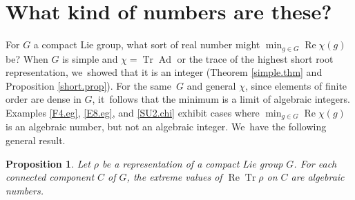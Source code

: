 \documentclass[JEP,XML,SOM,Unicode,NoFloatCountersInSection,published]{cedram}
\newtheorem{prop}[equation]{Proposition}
\theoremstyle{definition}
\DeclareMathOperator{\RE}{Re}
\DeclareMathOperator{\Tr}{Tr}
\DeclareMathOperator{\Ad}{Ad}
\begin{document}
\section{What kind of numbers are these?} \label{what}

For $G$ a compact Lie group, what sort of real number might $\min_{g \in G} \RE \chi(g)$ be? When $G$ is simple and $\chi = \Tr \Ad$ or the trace of the highest short root representation, we~showed that it is an integer (Theorem \ref{simple.thm} and Proposition \ref{short.prop}). For the same~$G$ and general $\chi$, since elements of finite order are dense in $G$, it~follows that the minimum is a limit of algebraic integers. Examples \ref{F4.eg}, \ref{E8.eg}, and \ref{SU2.chi} exhibit cases where $\min_{g \in G} \RE \chi(g)$ is an algebraic number, but not an algebraic integer. We~have the following general result.

\begin{prop} \label{which.prop}
Let $\rho$ be a representation of a compact Lie group $G$. For each connected component $C$ of $G$, the extreme values of $\RE \Tr \rho$ on $C$ are algebraic numbers.
\end{prop}
\end{document}
